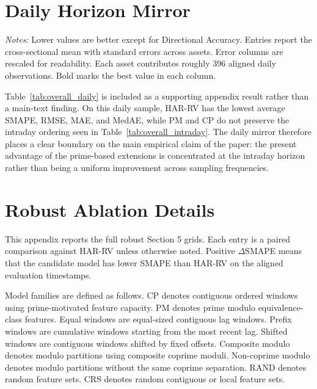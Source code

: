 ﻿\documentclass[11pt,a4paper]{article}
\begin{document}
\section{Daily Horizon Mirror}

{\renewcommand{\thetable}{1B}
\begin{center}
\label{tab:overall_daily}
\small
\renewcommand{\arraystretch}{1.15}
\setlength{\tabcolsep}{6pt}
\resizebox{0.98\textwidth}{!}{}

\vspace{0.1cm}
\footnotesize \parbox{0.92\textwidth}{\textit{Notes:} Lower values are better except for Directional Accuracy. Entries report the cross-sectional mean with standard errors across assets. Error columns are rescaled for readability. Each asset contributes roughly 396 aligned daily observations. Bold marks the best value in each column.}
\end{center}}

\noindent
Table~\ref{tab:overall_daily} is included as a supporting appendix result rather than a main-text finding. On this daily sample, HAR-RV has the lowest average SMAPE, RMSE, MAE, and MedAE, while PM and CP do not preserve the intraday ordering seen in Table~\ref{tab:overall_intraday}. The daily mirror therefore places a clear boundary on the main empirical claim of the paper: the present advantage of the prime-based extensions is concentrated at the intraday horizon rather than being a uniform improvement across sampling frequencies.

\section{Robust Ablation Details}

\noindent
This appendix reports the full robust Section 5 grids. Each entry is a paired comparison against HAR-RV unless otherwise noted. Positive $\Delta$SMAPE means that the candidate model has lower SMAPE than HAR-RV on the aligned evaluation timestamps.

\noindent
Model families are defined as follows. CP denotes contiguous ordered windows using prime-motivated feature capacity. PM denotes prime modulo equivalence-class features. Equal windows are equal-sized contiguous lag windows. Prefix windows are cumulative windows starting from the most recent lag. Shifted windows are contiguous windows shifted by fixed offsets. Composite modulo denotes modulo partitions using composite coprime moduli. Non-coprime modulo denotes modulo partitions without the same coprime separation. RAND denotes random feature sets. CRS denotes random contiguous or local feature sets.
\end{document}
